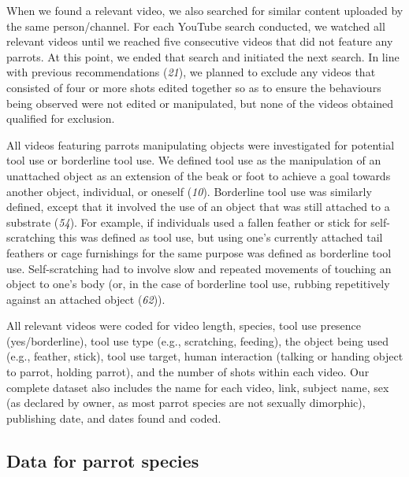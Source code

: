 \documentclass[
  man,floatsintext]{apa6}
\begin{document}
When we found a relevant video, we also searched for similar content uploaded by
the same person/channel. For each YouTube search conducted, we watched all
relevant videos until we reached five consecutive videos that did not feature
any parrots. At this point, we ended that search and initiated the next search.
In line with previous recommendations (\emph{21}), we planned to exclude any
videos that consisted of four or more shots edited together so as to ensure the
behaviours being observed were not edited or manipulated, but none of the videos
obtained qualified for exclusion.

All videos featuring parrots manipulating objects were investigated for
potential tool use or borderline tool use. We defined tool use as the
manipulation of an unattached object as an extension of the beak or foot to
achieve a goal towards another object, individual, or oneself (\emph{10}).
Borderline tool use was similarly defined, except that it involved the use of an
object that was still attached to a substrate (\emph{54}). For example, if
individuals used a fallen feather or stick for self-scratching this was defined
as tool use, but using one's currently attached tail feathers or cage
furnishings for the same purpose was defined as borderline tool use.
Self-scratching had to involve slow and repeated movements of touching an object
to one's body (or, in the case of borderline tool use, rubbing repetitively
against an attached object (\emph{62})).

All relevant videos were coded for video length, species, tool use presence
(yes/borderline), tool use type (e.g., scratching, feeding), the object being
used (e.g., feather, stick), tool use target, human interaction
(talking or handing object to parrot, holding parrot), and the number of shots
within each video. Our complete dataset also includes the name for each video,
link, subject name, sex (as declared by owner, as most parrot species are not
sexually dimorphic), publishing date, and dates found and coded.

\hypertarget{data-for-parrot-species}{%
\subsection{Data for parrot species}\label{data-for-parrot-species}}
\end{document}
